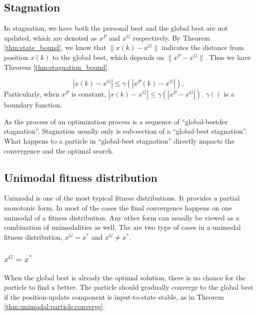 \subsection{Stagnation}

In stagnation, we have both the personal best and the global best are not updated, which are denoted as $ x^{P} $ and $ x^{G} $ respectively.
By Theorem \ref{thm:state_bound}, we know that $ \lVert x(k) - x^{G} \rVert $ indicates the distance from position $ x(k) $ to the global best, which depends on  $ \lVert x^{P} - x^{G} \rVert $.
Thus we have Theorem \ref{thm:stagnation_bound}.

\begin{mythm}
\label{thm:stagnation_bound}
\begin{equation}
\label{eq:stagnation_bound}
| x(k) - x^{G} | \leq \gamma ( | x^{P}(k) - x^{G} | ), 
\end{equation}
Particularly, when $ x^{P} $ is constant,
$  | x(k) - x^{G} | \leq \gamma ( | x^{P} - x^{G} | ). $
$ \gamma () $ is a boundary function.
\end{mythm}

As the process of an optimization process is a sequence of ``global-bestder stagnation''.
Stagnation usually only is sub-section of a ``global-best stagnation''.
What happens to a particle in ``global-best stagnation'' directly impacts the convergence and the optimal search.

\subsection{Unimodal fitness distribution}

Unimodal is one of the most typical fitness distributions.
It provides a partial monotonic form.
In most of the cases the final convergence happens on one unimodal of a fitness distribution.
Any other form can usually be viewed as a combination of unimodalities as well.
The are two type of cases in a unimodal fitness distribution, $ x^{G} = x^{*} $ and $ x^{G} \not = x^{*} $.

\subsubsection{$ x^{G} = x^{*} $}

When the global best is already the optimal solution, there is no chance for the particle to find a better.
The particle should gradually converge to the global best if the position-update component is input-to-state stable, as in Theorem \ref{thm:unimodal:particle:converge}.

